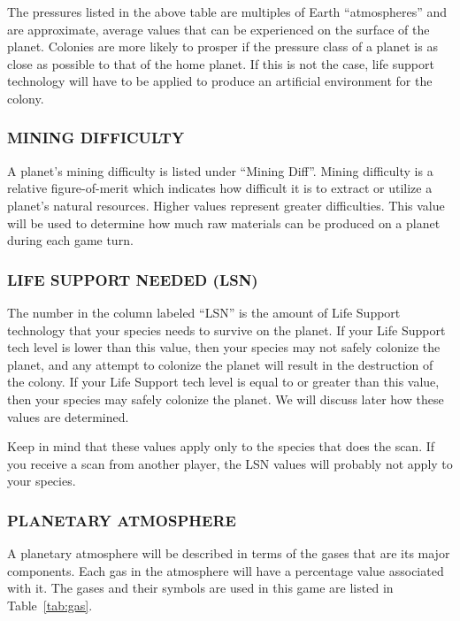 \documentclass[10pt,titlepage]{article}
\begin{document}
The pressures listed in the above table are multiples of Earth ``atmospheres''
and are approximate, average values that can be experienced on the surface of
the planet.  Colonies are more likely to prosper if the pressure class of a
planet is as close as possible to that of the home planet.  If this is not the
case, life support technology will have to be applied to produce an artificial
environment for the colony.


\subsubsection{MINING DIFFICULTY}

A planet's mining difficulty is listed under ``Mining Diff''.  Mining difficulty
is a relative figure-of-merit which indicates how difficult it is to extract
or utilize a planet's natural resources.  Higher values represent greater
difficulties.  This value will be used to determine how much raw materials
can be produced on a planet during each game turn.


\subsubsection{LIFE SUPPORT NEEDED (LSN)}

The number in the column labeled ``LSN'' is the amount of Life Support technology
that your species needs to survive on the planet.  If your Life Support tech
level is lower than this value, then your species may not safely colonize the
planet, and any attempt to colonize the planet will result in the destruction
of the colony.  If your Life Support tech level is equal to or greater than
this value, then your species may safely colonize the planet.  We will discuss
later how these values are determined.

Keep in mind that these values apply only to the species that does the scan.
If you receive a scan from another player, the LSN values will probably not
apply to your species.


\subsubsection{PLANETARY ATMOSPHERE}

A planetary atmosphere will be described in terms of the gases that are its
major components.  Each gas in the atmosphere will have a percentage value
associated with it.  The gases and their symbols are used in this
game are listed in Table~\ref{tab:gas}.
\end{document}
